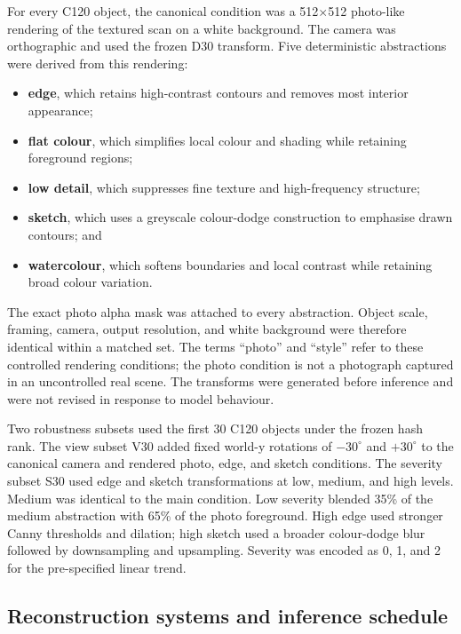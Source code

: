 \documentclass[12pt,a4paper]{article}
\begin{document}
For every C120 object, the canonical condition was a 512$\times$512 photo-like rendering of the textured scan on a white background. The camera was orthographic and used the frozen D30 transform. Five deterministic abstractions were derived from this rendering:
\begin{itemize}
    \item \textbf{edge}, which retains high-contrast contours and removes most interior appearance;
    \item \textbf{flat colour}, which simplifies local colour and shading while retaining foreground regions;
    \item \textbf{low detail}, which suppresses fine texture and high-frequency structure;
    \item \textbf{sketch}, which uses a greyscale colour-dodge construction to emphasise drawn contours; and
    \item \textbf{watercolour}, which softens boundaries and local contrast while retaining broad colour variation.
\end{itemize}

The exact photo alpha mask was attached to every abstraction. Object scale, framing, camera, output resolution, and white background were therefore identical within a matched set. The terms \enquote{photo} and \enquote{style} refer to these controlled rendering conditions; the photo condition is not a photograph captured in an uncontrolled real scene. The transforms were generated before inference and were not revised in response to model behaviour.

Two robustness subsets used the first 30 C120 objects under the frozen hash rank. The view subset V30 added fixed world-y rotations of $-30^{\circ}$ and $+30^{\circ}$ to the canonical camera and rendered photo, edge, and sketch conditions. The severity subset S30 used edge and sketch transformations at low, medium, and high levels. Medium was identical to the main condition. Low severity blended 35\% of the medium abstraction with 65\% of the photo foreground. High edge used stronger Canny thresholds and dilation; high sketch used a broader colour-dodge blur followed by downsampling and upsampling. Severity was encoded as 0, 1, and 2 for the pre-specified linear trend.

\subsection{Reconstruction systems and inference schedule}
\end{document}
